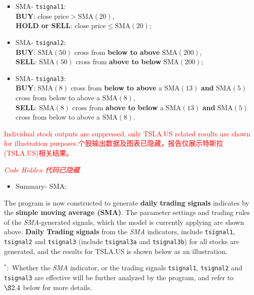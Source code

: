 \documentclass[
]{book}
\providecommand{\tightlist}{%
  \setlength{\itemsep}{0pt}\setlength{\parskip}{0pt}}
\begin{document}
\begin{itemize}
\item
  SMA- \texttt{tsignal1}:\\
  \textbf{BUY}: \(\text{close price}>\text{SMA}(20)\),\\
  \textbf{HOLD or SELL}: \(\text{close price}\leq \text{SMA}(20)\);
\item
  SMA- \texttt{tsignal2}:\\
  \textbf{BUY}: \(\text{SMA}(50)\) cross from \textbf{below to above}
  \(\text{SMA}(200)\),\\
  \textbf{SELL}: \(\text{SMA}(50)\) cross from \textbf{above to below}
  \(\text{SMA}(200)\);
\item
  SMA- \texttt{tsignal3}:\\
  \textbf{BUY}: \(\text{SMA}(8)\) cross from \textbf{below to above} a
  \(\text{SMA}(13)\) \textbf{and} \(\text{SMA}(5)\) cross from below to
  above a \(\text{SMA}(8)\),\\
  \textbf{SELL}: \(\text{SMA}(8)\) cross from \textbf{above to below} a
  \(\text{SMA}(13)\) \textbf{and} \(\text{SMA}(5)\) cross from below to
  above a \(\text{SMA}(8)\).
\end{itemize}

\textcolor{red}{Individual stock outputs are suppressed, only TSLA.US related results are shown for illustration purposes.个股输出数据及图表已隐藏，报告仅展示特斯拉(TSLA.US)相关结果。}

\emph{\textcolor{red}{Code Hidden 代码已隐藏}}

\begin{itemize}
\tightlist
\item
  Summary- SMA:
\end{itemize}

The program is now constructed to generate \textbf{daily trading
signals} indicates by the \textbf{simple moving average (SMA)}. The
parameter settings and trading rules of the \emph{SMA}-generated
signals, which the model is currently applying are shown above.
\textbf{Daily Trading signals} from the \emph{SMA} indicators, include
\texttt{tsignal1}, \texttt{tsignal2} and \texttt{tsignal3} (include
\texttt{tsignal3a} and \texttt{tsignal3b}) for all stocks are generated,
and the results for TSLA.US is shown below as an illustration.

\(^*:\) Whether the \emph{SMA} indicator, or the trading signals
\texttt{tsignal1}, \texttt{tsignal2} and \texttt{tsignal3} are effective
will be further analyzed by the program, and refer to \(\S 2.4\) below
for more details.
\end{document}
